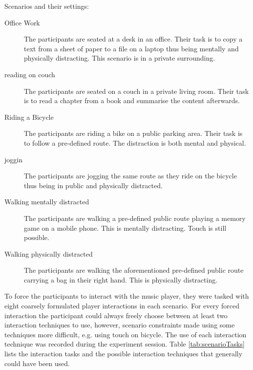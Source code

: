 Scenarios and their settings:
\begin{description}
	\item[Office Work]{The participants are seated at a desk in an office. Their task is to copy a text from a sheet of paper to a file on a laptop thus being mentally and physically distracting. This scenario is in a private surrounding.}
	\item[reading on couch]{The participants are seated on a couch in a private living room. Their task is to read a chapter from a book and summarise the content afterwards.}
	\item[Riding a Bicycle]{The participants are riding a bike on a public parking area. Their task is to follow a pre-defined route. The distraction is both mental and physical.}
	\item[joggin]{The participants are jogging the same route as they ride on the bicycle thus being in public and physically distracted.}
	\item[Walking mentally distracted]{The participants are walking a pre-defined public route playing a memory game on a mobile phone. This is mentally distracting. Touch is still possible.}
	\item[Walking physically distracted]{The participants are walking the aforementioned pre-defined public route carrying a bag in their right hand. This is physically distracting.}
\end{description}

To force the participants to interact with the music player, they were tasked with eight coarsely formulated player interactions in each scenario. For every forced interaction the participant could always freely choose between at least two interaction techniques to use, however, scenario constraints made using some techniques more difficult, e.g. using touch on bicycle. The use of each interaction technique was recorded during the experiment session. Table \ref{tab:scenarioTasks} lists the interaction tasks and the possible interaction techniques that generally could have been used.

